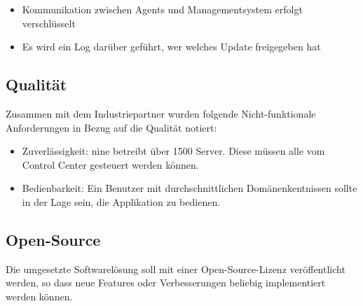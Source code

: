 \begin{itemize}
\item Kommunikation zwischen Agents und Managementsystem erfolgt verschlüsselt
\item Es wird ein Log darüber geführt, wer welches Update freigegeben hat
\end{itemize}

\subsection*{Qualität}

Zusammen mit dem Industriepartner wurden folgende Nicht-funktionale Anforderungen in Bezug auf die Qualität notiert:

\begin{itemize}
    \item Zuverlässigkeit: \gls{nine} betreibt über 1500 Server. Diese müssen alle vom Control Center gesteuert werden können.
    \item Bedienbarkeit: Ein Benutzer mit durchschnittlichen Domänenkentnissen sollte in der Lage sein, die Applikation zu bedienen.
\end{itemize}

\subsection*{Open-Source}

Die umgesetzte Softwarelösung soll mit einer Open-Source-Lizenz veröffentlicht werden, so dass neue Features oder Verbesserungen beliebig implementiert werden können.